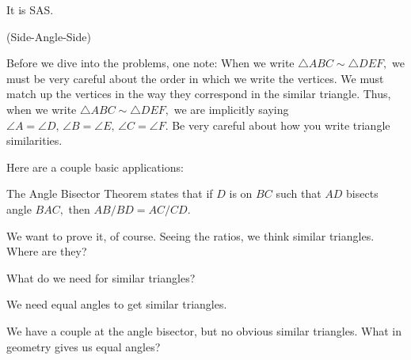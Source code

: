 It is SAS.

(Side-Angle-Side)

Before we dive into the problems, one note:  When we write $\triangle ABC \sim \triangle DEF,$ we must be very careful about the order in which we write the vertices. We must match up the vertices in the way they correspond in the similar triangle. Thus, when we write $\triangle ABC \sim \triangle DEF,$ we are implicitly saying $\angle A = \angle D,\, \angle B = \angle E,\, \angle C = \angle F.$ Be very careful about how you write triangle similarities.

Here are a couple basic applications:

The Angle Bisector Theorem states that if $D$ is on $BC$ such that $AD$ bisects angle $BAC,$ then $AB/BD = AC/CD.$

We want to prove it, of course. Seeing the ratios, we think similar triangles. Where are they?

What do we need for similar triangles?






We need equal angles to get similar triangles.

We have a couple at the angle bisector, but no obvious similar triangles. What in geometry gives us equal angles?




